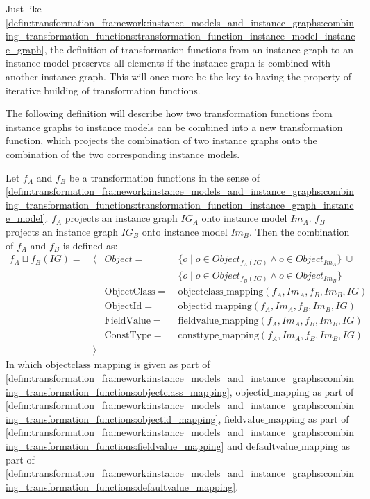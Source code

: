 Just like \cref{defin:transformation_framework:instance_models_and_instance_graphs:combining_transformation_functions:transformation_function_instance_model_instance_graph}, the definition of transformation functions from an instance graph to an instance model preserves all elements if the instance graph is combined with another instance graph. This will once more be the key to having the property of iterative building of transformation functions.

The following definition will describe how two transformation functions from instance graphs to instance models can be combined into a new transformation function, which projects the combination of two instance graphs onto the combination of the two corresponding instance models.

\begin{defin}
\label{defin:transformation_framework:instance_models_and_instance_graphs:combining_transformation_functions:combination_transformation_function_instance_graph_instance_model}
Let $f_A$ and $f_B$ be a transformation functions in the sense of \cref{defin:transformation_framework:instance_models_and_instance_graphs:combining_transformation_functions:transformation_function_instance_graph_instance_model}. $f_A$ projects an instance graph $IG_A$ onto instance model $Im_A$. $f_B$ projects an instance graph $IG_B$ onto instance model $Im_B$. Then the combination of $f_A$ and $f_B$ is defined as:
\begin{align*}
f_{A} \sqcup f_{B}(IG) =\ &\langle&
Object =\ &\{o \mid o \in Object_{f_{A}(IG)} \land o \in Object_{Im_A} \}\ \cup\\&&&
\{o \mid o \in Object_{f_{B}(IG)} \land o \in Object_{Im_B} \} \\&&
\mathrm{ObjectClass} =\ &\mathrm{objectclass\_\!mapping}(f_A, Im_A, f_B, Im_B, IG) \\&&
\mathrm{ObjectId} =\ &\mathrm{objectid\_\!mapping}(f_A, Im_A, f_B, Im_B, IG) \\&&
\mathrm{FieldValue} =\ &\mathrm{fieldvalue\_\!mapping}(f_A, Im_A, f_B, Im_B, IG) \\&&
\mathrm{ConstType} =\ &\mathrm{consttype\_\!mapping}(f_A, Im_A, f_B, Im_B, IG) \\&
\rangle
\end{align*}
In which $\mathrm{objectclass\_\!mapping}$ is given as part of \cref{defin:transformation_framework:instance_models_and_instance_graphs:combining_transformation_functions:objectclass_mapping}, $\mathrm{objectid\_\!mapping}$ as part of \cref{defin:transformation_framework:instance_models_and_instance_graphs:combining_transformation_functions:objectid_mapping}, $\mathrm{fieldvalue\_\!mapping}$ as part of \cref{defin:transformation_framework:instance_models_and_instance_graphs:combining_transformation_functions:fieldvalue_mapping} and $\mathrm{defaultvalue\_\!mapping}$ as part of \cref{defin:transformation_framework:instance_models_and_instance_graphs:combining_transformation_functions:defaultvalue_mapping}.
\end{defin}

